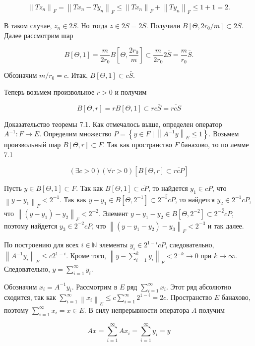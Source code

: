 $$
\left\|T z_{n}\right\|_{F}=\left\|T x_{n}-T y_{n}\right\|_{F} \leq\left\|T x_{n}\right\|_{F}+\left\|T y_{n}\right\|_{F} \leq 1+1=2 .
$$

В таком случае, $z_{n} \in 2 S$. Но тогда $z \in \overline{2 S}=2 \bar{S}$. Получили $B\left[\Theta, 2 r_{0} / m\right] \subset 2 \bar{S}$. Далее рассмотрим шар

$$
B[\Theta, 1]=\frac{m}{2 r_{0}} B\left[\Theta, \frac{2 r_{0}}{m}\right] \subset \frac{m}{2 r_{0}} 2 \bar{S}=\frac{m}{r_{0}} \bar{S} .
$$

Обозначим $m / r_{0}=c$. Итак, $B[\Theta, 1] \subset c \bar{S}$.

Теперь возьмем произвольное $r>0$ и получим

$$
B[\Theta, r]=r B[\Theta, 1] \subset r c \bar{S}=\overline{r c S}
$$

Доказательство теоремы 7.1. Как отмечалось выше, определен оператор $A^{-1}: F \rightarrow E$. Определим множество $P=\left\{y \in F \mid\left\|A^{-1} y\right\|_{E} \leq 1\right\}$. Возьмем произвольный шар $B[\Theta, r] \subset F$. Так как пространство $F$ банахово, то по лемме 7.1

$$
(\exists c>0)(\forall r>0)[B[\Theta, r] \subset \overline{r c P}]
$$

Пусть $y \in B[\Theta, 1] \subset F$. Так как $B[\Theta, 1] \subset \overline{c P}$, то найдется $y_{1} \in c P$, что $\left\|y-y_{1}\right\|_{F}<2^{-1}$. Так как $y-y_{1} \in B\left[\Theta, 2^{-1}\right] \subset \overline{2^{-1} c P}$, то найдется $y_{2} \in 2^{-1} c P$, что $\left\|\left(y-y_{1}\right)-y_{2}\right\|_{F}<2^{-2}$. Элемент $y-y_{1}-y_{2} \in B\left[\Theta, 2^{-2}\right] \subset \overline{2^{-2} c P}$, поэтому найдется $y_{3} \in 2^{-2} c P$, что $\left\|\left(y-y_{1}-y_{2}\right)-y_{3}\right\|_{F}<2^{-3}$ и так далее.

По построению для всех $i \in \mathbb{N}$ элементы $y_{i} \in 2^{1-i} c P$, следовательно, $\left\|A^{-1} y_{i}\right\|_{E} \leq c 2^{1-i}$. Кроме того, $\left\|y-\sum_{i=1}^{k} y_{i}\right\|_{F}<2^{-k} \rightarrow 0$ при $k \rightarrow \infty$. Следовательно, $y=\sum_{i=1}^{\infty} y_{i}$.

Обозначим $x_{i}=A^{-1} y_{i}$. Рассмотрим в $E$ ряд $\sum_{i=1}^{\infty} x_{i}$. Этот ряд абсолютно сходится, так как $\sum_{i=1}^{\infty}\left\|x_{i}\right\|_{E} \leq c \sum_{i=1}^{\infty} 2^{1-i}=2 c$. Пространство $E$ банахово, поэтому $\sum_{i=1}^{\infty} x_{i}=x \in E$. В силу непрерывности оператора $A$ получим

$$
A x=\sum_{i=1}^{\infty} A x_{i}=\sum_{i=1}^{\infty} y_{i}=y
$$

